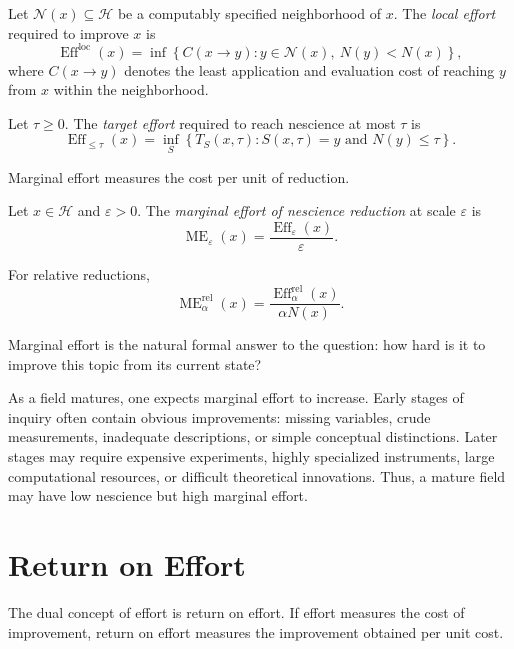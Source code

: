 \begin{definition}
Let \(\mathcal{N}(x)\subseteq\mathcal{H}\) be a computably specified neighborhood of \(x\). The \emph{local effort} required to improve \(x\) is
\[
\operatorname{Eff}^{\mathrm{loc}}(x)
=
\inf
\left\{
C(x\to y):
y\in\mathcal{N}(x),\ N(y)<N(x)
\right\},
\]
where \(C(x\to y)\) denotes the least application and evaluation cost of reaching \(y\) from \(x\) within the neighborhood.
\end{definition}

\begin{definition}
Let \(\tau\geq 0\). The \emph{target effort} required to reach nescience at most \(\tau\) is
\[
\operatorname{Eff}_{\leq\tau}(x)
=
\inf_S
\left\{
T_S(x,\tau):
S(x,\tau)=y
\text{ and }
N(y)\leq\tau
\right\}.
\]
\end{definition}

Marginal effort measures the cost per unit of reduction.

\begin{definition}
Let \(x\in\mathcal{H}\) and \(\varepsilon>0\). The \emph{marginal effort of nescience reduction} at scale \(\varepsilon\) is
\[
\operatorname{ME}_{\varepsilon}(x)
=
\frac{\operatorname{Eff}_{\varepsilon}(x)}{\varepsilon}.
\]
\end{definition}

For relative reductions,
\[
\operatorname{ME}_{\alpha}^{\mathrm{rel}}(x)
=
\frac{\operatorname{Eff}_{\alpha}^{\mathrm{rel}}(x)}{\alpha N(x)}.
\]

Marginal effort is the natural formal answer to the question: how hard is it to improve this topic from its current state?

As a field matures, one expects marginal effort to increase. Early stages of inquiry often contain obvious improvements: missing variables, crude measurements, inadequate descriptions, or simple conceptual distinctions. Later stages may require expensive experiments, highly specialized instruments, large computational resources, or difficult theoretical innovations. Thus, a mature field may have low nescience but high marginal effort.

\section{Return on Effort}
\label{sec:return_on_effort}

The dual concept of effort is return on effort. If effort measures the cost of improvement, return on effort measures the improvement obtained per unit cost.

